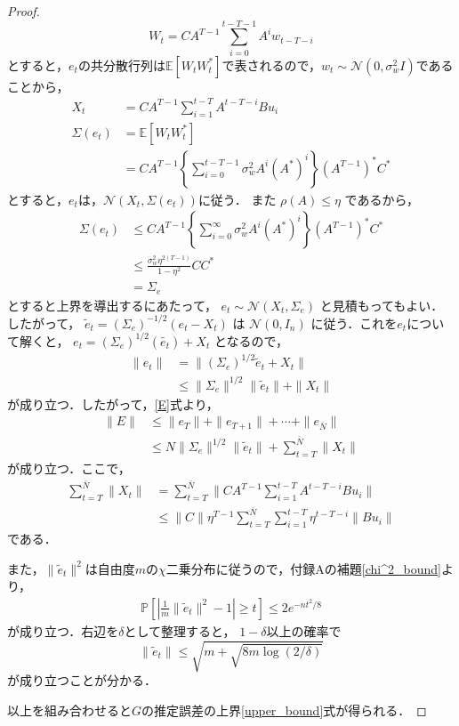 \begin{proof}
\begin{equation*}
    W_t = CA^{T-1} \sum_{i = 0}^{t-T-1}A^iw_{t-T-i}
\end{equation*}
とすると，$e_t$の共分散行列は$\mathbb{E}[W_tW_t^*]$で表されるので，$w_t \sim \mathcal{N}(0, \sigma_w^2I)$であることから，
\begin{align*}
    X_t &= CA^{T-1} \sum_{i = 1}^{t-T} A^{t-T-i}Bu_i\\
    \Sigma(e_t) &=\mathbb{E}[W_tW_t^*] \\
    &= CA^{T-1} \left\{ \sum_{i = 0}^{t-T-1} \sigma_w^2 A^i(A^*)^i \right\}(A^{T-1})^*C^*
\end{align*}
とすると，$e_t$は，$\mathcal{N}(X_t, \Sigma(e_t))$に従う．
また
$\rho(A) \leq \eta$
であるから，
\begin{align*}
    \Sigma(e_t) &\leq CA^{T-1} \left\{ \sum_{i = 0}^\infty \sigma_w^2 A^i(A^*)^i \right\}({A^{T-1}})^*C^*\\
    &\leq \frac{\sigma_w^2\eta^{2(T-1)}}{1-\eta^2}CC^*\\
    & = \Sigma_e
\end{align*}
とすると上界を導出するにあたって，
$e_t \sim \mathcal{N}(X_t, \Sigma_e)$
と見積もってもよい．したがって，
$\tilde{e}_t = (\Sigma_e)^{-1/2}(e_t-X_t)$
は
$\mathcal{N}(0, I_n)$
に従う．これを$e_t$について解くと，
$e_t = (\Sigma_e)^{1/2}(\tilde{e_t})+X_t$
となるので，
\begin{align*}
    \|e_t\| &= \| (\Sigma_e)^{1/2}  \tilde{e}_t  + X_t\| \\
    &\leq \| \Sigma_e \|^{1/2} \| \tilde{e}_t \| + \|X_t\|
\end{align*}
が成り立つ．したがって，\eqref{E}式より，
\begin{align*}
    \|E\| &\leq \|e_T\| + \|e_{T+1}\| + \cdots + \|e_{\bar{N}}\| \\
    &\leq N \| \Sigma_e \|^{1/2} \| \tilde{e}_t \|  +\sum_{t = T}^{\bar{N}}\|X_t\| 
\end{align*}
が成り立つ．ここで，
\begin{align*}
    \sum_{t = T}^{\bar{N}}\|X_t\| &= \sum_{t = T}^{\bar{N}}\|CA^{T-1} \sum_{i = 1}^{t-T}A^{t-T-i}Bu_i\| \\
    &\leq \|C\|\eta^{T-1} \sum_{t = T}^{\bar{N}}\sum_{i = 1}^{t-T}\eta^{t-T-i}\|Bu_i\|
\end{align*}
である．

また，$\|\tilde{e}_t\|^2$は自由度$m$の$\chi$二乗分布に従うので，付録Aの補題\ref{chi^2_bound}より，
\begin{align*}
    \mathbb{P}\left[\left|\frac{1}{m}\|\tilde{e}_t\|^2 -1 \right| \geq t \right] \leq 2e^{-nt^2/8}
\end{align*}
が成り立つ．右辺を$\delta$として整理すると，
$1-\delta$以上の確率で
\begin{equation*}
    \|\tilde{e}_t\| \leq \sqrt{m + \sqrt{8m\log{(2/\delta)}}}
\end{equation*}
が成り立つことが分かる．

以上を組み合わせると$G$の推定誤差の上界\eqref{upper_bound}式が得られる．
\end{proof}

